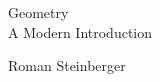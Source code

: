 \begin{titlingpage}

	\centering

	\vspace*{\fill}

	{\Huge Geometry}\\[2em]

	{\Large A Modern Introduction}

	\vspace*{\fill}

	Roman Steinberger

\end{titlingpage}
